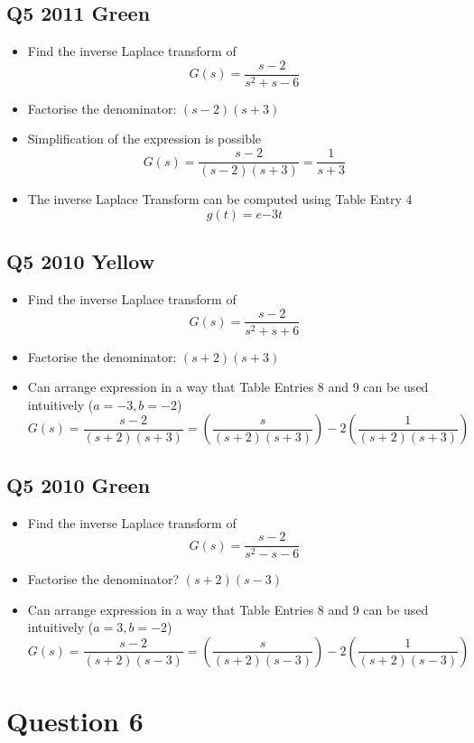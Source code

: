 \documentclass[11pt,a4paper,titlepage,oneside,openany]{article}
\numberwithin{equation}{section}
\numberwithin{algorithm}{section}
\numberwithin{figure}{section}
\numberwithin{table}{section}
\begin{document}
\subsection*{Q5 2011 Green}
\begin{itemize}
\item Find the inverse Laplace transform of
\[ G(s) = \frac{s-2}{s^2 + s -6} \]
\item Factorise the denominator:  $(s-2)(s+3)$
\item Simplification of the expression is possible
\[ G(s) = \frac{s-2}{(s-2)(s+3)} = \frac{1}{s+3} \]
\item The inverse Laplace Transform can be computed using Table Entry 4
\[ g(t)  = e{-3t}  \]

\end{itemize}
\subsection*{Q5 2010 Yellow}
\begin{itemize}
\item Find the inverse Laplace transform of
\[ G(s) = \frac{s-2}{s^2 + s + 6} \]
\item Factorise the denominator:  $(s+2)(s+3)$
\item Can arrange expression in a way that Table Entries 8 and 9 can be used intuitively ($a=-3, b=-2$)
\[ G(s) = \frac{s-2}{(s+2)(s+3)} = \left(\frac{s}{(s+2)(s+3)} \right)-2\left(\frac{1}{(s+2)(s+3)}\right) \]
\end{itemize}
\subsection*{Q5 2010 Green}
\begin{itemize}
\item Find the inverse Laplace transform of
\[ G(s) = \frac{s-2}{s^2 - s - 6} \]
\item Factorise the denominator?  $(s+2)(s-3)$
\item Can arrange expression in a way that Table Entries 8 and 9 can be used intuitively ($a=3, b=-2$)
\[ G(s) = \frac{s-2}{(s+2)(s-3)} = \left(\frac{s}{(s+2)(s-3)} \right)-2\left(\frac{1}{(s+2)(s-3)}\right) \]
\end{itemize}
\section*{Question 6}
\end{document}
